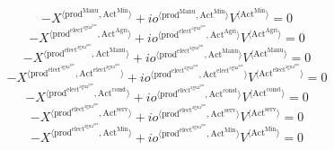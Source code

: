 \begin{equation}
-{X}^{\langle \mathrm{prod}^{\mathrm{Manu}},\mathrm{Act}^{\mathrm{Min}}\rangle} + {{{i\!o}}^{\langle \mathrm{\mathrm{prod}^{\mathrm{Manu}}},\mathrm{\mathrm{Act}^{\mathrm{Min}}}\rangle}} {{V}^{\langle \mathrm{Act}^{\mathrm{Min}}\rangle}} = 0
\end{equation}
\begin{equation}
-{X}^{\langle \mathrm{prod}^{\mathrm{elect}^{\mathrm{agua}^{\mathrm{gas}}}},\mathrm{Act}^{\mathrm{Agri}}\rangle} + {{{i\!o}}^{\langle \mathrm{\mathrm{prod}^{\mathrm{elect}^{\mathrm{agua}^{\mathrm{gas}}}}},\mathrm{\mathrm{Act}^{\mathrm{Agri}}}\rangle}} {{V}^{\langle \mathrm{Act}^{\mathrm{Agri}}\rangle}} = 0
\end{equation}
\begin{equation}
-{X}^{\langle \mathrm{prod}^{\mathrm{elect}^{\mathrm{agua}^{\mathrm{gas}}}},\mathrm{Act}^{\mathrm{Manu}}\rangle} + {{{i\!o}}^{\langle \mathrm{\mathrm{prod}^{\mathrm{elect}^{\mathrm{agua}^{\mathrm{gas}}}}},\mathrm{\mathrm{Act}^{\mathrm{Manu}}}\rangle}} {{V}^{\langle \mathrm{Act}^{\mathrm{Manu}}\rangle}} = 0
\end{equation}
\begin{equation}
-{X}^{\langle \mathrm{prod}^{\mathrm{elect}^{\mathrm{agua}^{\mathrm{gas}}}},\mathrm{Act}^{\mathrm{elect}^{\mathrm{agua}^{\mathrm{gas}}}}\rangle} + {{{i\!o}}^{\langle \mathrm{\mathrm{prod}^{\mathrm{elect}^{\mathrm{agua}^{\mathrm{gas}}}}},\mathrm{\mathrm{Act}^{\mathrm{elect}^{\mathrm{agua}^{\mathrm{gas}}}}}\rangle}} {{V}^{\langle \mathrm{Act}^{\mathrm{elect}^{\mathrm{agua}^{\mathrm{gas}}}}\rangle}} = 0
\end{equation}
\begin{equation}
-{X}^{\langle \mathrm{prod}^{\mathrm{elect}^{\mathrm{agua}^{\mathrm{gas}}}},\mathrm{Act}^{\mathrm{const}}\rangle} + {{{i\!o}}^{\langle \mathrm{\mathrm{prod}^{\mathrm{elect}^{\mathrm{agua}^{\mathrm{gas}}}}},\mathrm{\mathrm{Act}^{\mathrm{const}}}\rangle}} {{V}^{\langle \mathrm{Act}^{\mathrm{const}}\rangle}} = 0
\end{equation}
\begin{equation}
-{X}^{\langle \mathrm{prod}^{\mathrm{elect}^{\mathrm{agua}^{\mathrm{gas}}}},\mathrm{Act}^{\mathrm{serv}}\rangle} + {{{i\!o}}^{\langle \mathrm{\mathrm{prod}^{\mathrm{elect}^{\mathrm{agua}^{\mathrm{gas}}}}},\mathrm{\mathrm{Act}^{\mathrm{serv}}}\rangle}} {{V}^{\langle \mathrm{Act}^{\mathrm{serv}}\rangle}} = 0
\end{equation}
\begin{equation}
-{X}^{\langle \mathrm{prod}^{\mathrm{elect}^{\mathrm{agua}^{\mathrm{gas}}}},\mathrm{Act}^{\mathrm{Min}}\rangle} + {{{i\!o}}^{\langle \mathrm{\mathrm{prod}^{\mathrm{elect}^{\mathrm{agua}^{\mathrm{gas}}}}},\mathrm{\mathrm{Act}^{\mathrm{Min}}}\rangle}} {{V}^{\langle \mathrm{Act}^{\mathrm{Min}}\rangle}} = 0
\end{equation}
